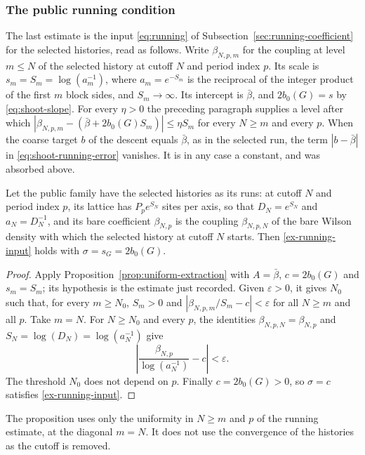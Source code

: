 \subsubsection{The public running condition}
The last estimate is the input \eqref{eq:running} of
Subsection~\ref{sec:running-coefficient} for the selected histories, read as
follows. Write $\beta_{N,p,m}$ for the coupling at level $m\le N$ of the
selected history at cutoff $N$ and period index $p$. Its scale is
$s_m=S_m=\log(a_m^{-1})$, where $a_m=e^{-S_m}$ is the reciprocal of the
integer product of the first $m$ block sides, and $S_m\to\infty$. Its
intercept is $\bar\beta$, and $2b_0(G)=s$ by \eqref{eq:shoot-slope}. For
every $\eta>0$ the preceding paragraph supplies a level after which
$|\beta_{N,p,m}-(\bar\beta+2b_0(G)S_m)|\le\eta S_m$ for every $N\ge m$ and
every $p$. When the coarse target $b$ of the descent equals $\bar\beta$,
as in the selected run, the term $|b-\bar\beta|$ in
\eqref{eq:shoot-running-error} vanishes. It is in any case a constant, and
was absorbed above.

\begin{proposition}
\label{prop:shoot-public-running}
Let the public family have the selected histories as its runs: at cutoff $N$
and period index $p$, its lattice has $P_pe^{S_N}$ sites per axis, so that
$D_N=e^{S_N}$ and $a_N=D_N^{-1}$, and its bare coefficient $\beta_{N,p}$
is the coupling $\beta_{N,p,N}$ of the bare Wilson density with which the
selected history at cutoff $N$ starts. Then \eqref{ex-running-input} holds
with $\sigma=s_G=2b_0(G)$.
\end{proposition}

\begin{proof}
Apply Proposition~\ref{prop:uniform-extraction} with $A=\bar\beta$,
$c=2b_0(G)$ and $s_m=S_m$; its hypothesis is the estimate just recorded.
Given $\varepsilon>0$, it gives $N_0$ such that, for every $m\ge N_0$,
$S_m>0$ and $|\beta_{N,p,m}/S_m-c|<\varepsilon$ for all $N\ge m$ and all
$p$. Take $m=N$. For $N\ge N_0$ and every $p$, the identities
$\beta_{N,p,N}=\beta_{N,p}$ and $S_N=\log(D_N)=\log(a_N^{-1})$ give
\[
 \left|\frac{\beta_{N,p}}{\log(a_N^{-1})}-c\right|<\varepsilon .
\]
The threshold $N_0$ does not depend on $p$. Finally $c=2b_0(G)>0$, so
$\sigma=c$ satisfies \eqref{ex-running-input}.
\end{proof}

The proposition uses only the uniformity in $N\ge m$ and $p$ of the running
estimate, at the diagonal $m=N$. It does not use the convergence of the
histories as the cutoff is removed.
